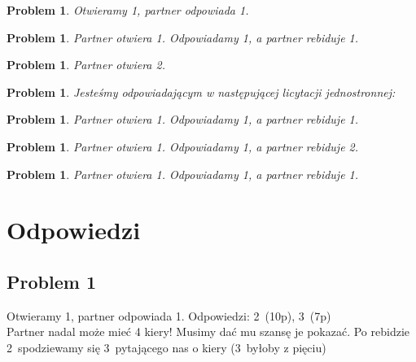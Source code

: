 \documentclass[12pt, a4paper]{article}
\newtheorem{problem}[table]{Problem}
\begin{document}
\begin{problem}
    Otwieramy \emph{1\spades}, partner odpowiada \emph{1\nt}.
\end{problem}


\begin{problem}
    Partner otwiera \emph{1\diams}. Odpowiadamy \emph{1\hearts}, a partner rebiduje \emph{1\spades}.
\end{problem}


\begin{problem}
    Partner otwiera \emph{2\nt}.
\end{problem}


\begin{problem}
    Jesteśmy odpowiadającym w następującej licytacji jednostronnej:
\end{problem}
\begin{center}
\end{center}


\begin{problem}
    Partner otwiera \emph{1\hearts}. Odpowiadamy \emph{1\spades}, a partner rebiduje \emph{1\nt}.
\end{problem}


\begin{problem}
    Partner otwiera \emph{1\diams}. Odpowiadamy \emph{1\spades}, a partner rebiduje \emph{2\nt}.
\end{problem}


\begin{problem}
    Partner otwiera \emph{1\diams}. Odpowiadamy \emph{1\hearts}, a partner rebiduje \emph{1\spades}.
\end{problem}


\pagebreak

\section*{Odpowiedzi}
\subsection*{Problem 1}
Otwieramy 1\spades, partner odpowiada 1\nt.
Odpowiedzi: 2\nt\ (10p), 3\hearts\ (7p) \\
Partner nadal może mieć 4 kiery! Musimy dać mu szansę je pokazać. Po rebidzie 2\nt\ spodziewamy się
3\clubs\ pytającego nas o kiery (3\hearts\ byłoby z pięciu)
\end{document}
